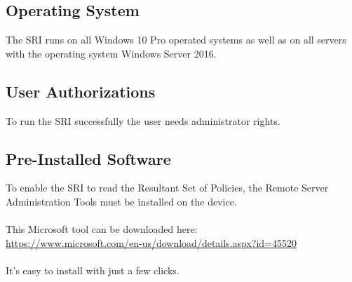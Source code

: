 
\thispagestyle{plain}
\renewcommand\section{\stdsection}
\setcounter{section}{2}
\subsection{Operating System}
The SRI runs on all Windows 10 Pro operated systems as well as on all servers with the operating system Windows Server 2016.
\subsection{User Authorizations}
To run the SRI successfully the user needs administrator rights.
\subsection{Pre-Installed Software}
To enable the SRI to read the Resultant Set of Policies, the Remote Server Administration Tools must be installed on the device.
\\\\
This Microsoft tool can be downloaded here: \ \\
\url{https://www.microsoft.com/en-us/download/details.aspx?id=45520}
\\\\
It's easy to install with just a few clicks.